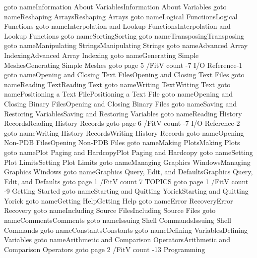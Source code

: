     \pdfoutline goto name{Information About Variables}{Information About Variables}
    \pdfoutline goto name{Reshaping Arrays}{Reshaping Arrays}
    \pdfoutline goto name{Logical Functions}{Logical Functions}
    \pdfoutline goto name{Interpolation and Lookup Functions}{Interpolation and Lookup Functions}
    \pdfoutline goto name{Sorting}{Sorting}
    \pdfoutline goto name{Transposing}{Transposing}
    \pdfoutline goto name{Manipulating Strings}{Manipulating Strings}
    \pdfoutline goto name{Advanced Array Indexing}{Advanced Array Indexing}
    \pdfoutline goto name{Generating Simple Meshes}{Generating Simple Meshes}
  \pdfoutline goto page 5 {/FitV} count -7 {I/O Reference-1}
    \pdfoutline goto name{Opening and Closing Text Files}{Opening and Closing Text Files}
    \pdfoutline goto name{Reading Text}{Reading Text}
    \pdfoutline goto name{Writing Text}{Writing Text}
    \pdfoutline goto name{Positioning a Text File}{Positioning a Text File}
    \pdfoutline goto name{Opening and Closing Binary Files}{Opening and Closing Binary Files}
    \pdfoutline goto name{Saving and Restoring Variables}{Saving and Restoring Variables}
    \pdfoutline goto name{Reading History Records}{Reading History Records}
  \pdfoutline goto page 6 {/FitV} count -7 {I/O Reference-2}
    \pdfoutline goto name{Writing History Records}{Writing History Records}
    \pdfoutline goto name{Opening Non-PDB Files}{Opening Non-PDB Files}
    \pdfoutline goto name{Making Plots}{Making Plots}
    \pdfoutline goto name{Plot Paging and Hardcopy}{Plot Paging and Hardcopy}
    \pdfoutline goto name{Setting Plot Limits}{Setting Plot Limits}
    \pdfoutline goto name{Managing Graphics Windows}{Managing Graphics Windows}
    \pdfoutline goto name{Graphics Query, Edit, and Defaults}{Graphics Query, Edit, and Defaults}
  \pdfoutline goto page 1 {/FitV} count 7 {TOPICS}
    \pdfoutline goto page 1 {/FitV} count -9 {Getting Started}
      \pdfoutline goto name{Starting and Quitting Yorick}{Starting and Quitting Yorick}
      \pdfoutline goto name{Getting Help}{Getting Help}
      \pdfoutline goto name{Error Recovery}{Error Recovery}
      \pdfoutline goto name{Including Source Files}{Including Source Files}
      \pdfoutline goto name{Comments}{Comments}
      \pdfoutline goto name{Issuing Shell Commands}{Issuing Shell Commands}
      \pdfoutline goto name{Constants}{Constants}
      \pdfoutline goto name{Defining Variables}{Defining Variables}
      \pdfoutline goto name{Arithmetic and Comparison Operators}{Arithmetic and Comparison Operators}
    \pdfoutline goto page 2 {/FitV} count -13 {Programming}
